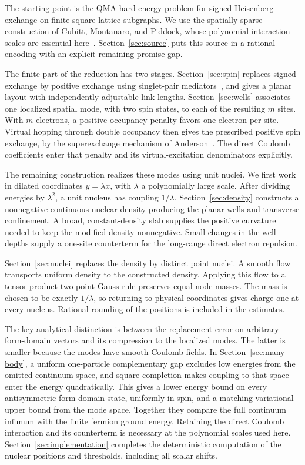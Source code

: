 The starting point is the QMA-hard energy problem for signed Heisenberg
exchange on finite square-lattice subgraphs. We use the spatially sparse
construction of Cubitt, Montanaro, and Piddock, whose polynomial
interaction scales are essential here~\cite[Theorem 48, Lemma 47, and
Section 10.1]{CMP2019}. Section~\ref{sec:source} puts this source in a
rational encoding with an explicit remaining promise gap.

The finite part of the reduction has two stages.
Section~\ref{sec:spin} replaces signed exchange by positive exchange
using singlet-pair mediators~\cite[Section 2.4 and Lemma 5]{PiddockMontanaro2017},
and gives a planar layout with independently adjustable link lengths.
Section~\ref{sec:wells} associates one localized
spatial mode, with two spin states, to each of the resulting $m$ sites.
With $m$ electrons, a positive occupancy penalty favors one electron per
site. Virtual hopping through double occupancy then gives the prescribed
positive spin exchange, by the superexchange mechanism of
Anderson~\cite{Anderson1959}. The direct Coulomb coefficients enter that
penalty and its virtual-excitation denominators explicitly.

The remaining construction realizes these modes using unit nuclei. We
first work in dilated coordinates $y=\lambda x$, with $\lambda$ a
polynomially large scale. After dividing energies by $\lambda^2$, a unit
nucleus has coupling $1/\lambda$. Section~\ref{sec:density} constructs a
nonnegative continuous nuclear density producing the planar wells and
transverse confinement. A broad, constant-density slab supplies the
positive curvature needed to keep the modified density nonnegative.
Small changes in the well depths supply a one-site counterterm for the
long-range direct electron repulsion.

Section~\ref{sec:nuclei} replaces the density by distinct point nuclei.
A smooth flow transports uniform density to the constructed density.
Applying this flow to a tensor-product two-point Gauss rule preserves
equal node masses. The mass is chosen to be exactly $1/\lambda$, so
returning to physical coordinates gives charge one at every nucleus.
Rational rounding of the positions is included in the estimates.

The key analytical distinction is between the replacement error on
arbitrary form-domain vectors and its compression to the localized
modes. The latter is smaller because the modes have smooth Coulomb
fields. In Section~\ref{sec:many-body}, a uniform one-particle
complementary gap excludes low energies from the omitted continuum
space, and square completion makes coupling to that space enter the
energy quadratically. This gives a lower energy bound on every
antisymmetric form-domain state, uniformly in spin, and a matching
variational upper bound from the mode space. Together they compare the
full continuum infimum with the finite fermion ground energy. Retaining
the direct Coulomb interaction and its counterterm is necessary at the
polynomial scales used here.
Section~\ref{sec:implementation} completes the deterministic computation
of the nuclear positions and thresholds, including all scalar shifts.

